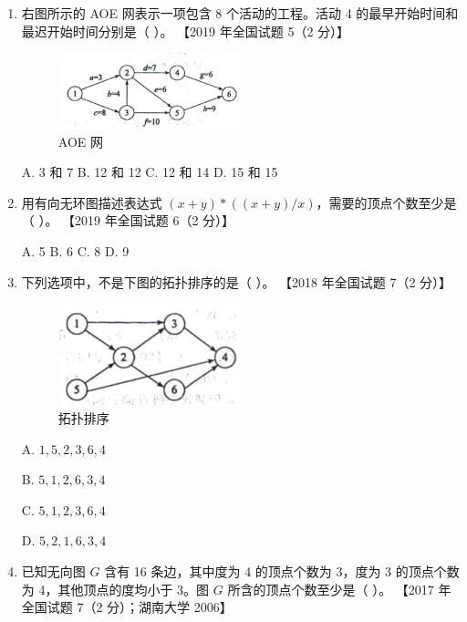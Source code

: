\documentclass[lang=cn,newtx,10pt,scheme=chinese]{elegantbook}
\begin{document}
\begin{enumerate}
    \item 右图所示的 AOE 网表示一项包含 8 个活动的工程。活动 4 的最早开始时间和最迟开始时间分别是（ ）。  
    【2019 年全国试题 5（2 分）】  
    \begin{figure}[h!]
            \centering
            \includegraphics[width=0.5\textwidth]{./figure/exercisePicPDF/chapter7/7-1.pdf}
            \caption{AOE 网}
    \end{figure}

    A. 3 和 7 \quad B. 12 和 12 \quad C. 12 和 14 \quad D. 15 和 15  

    \item 用有向无环图描述表达式 $(x + y) \ast ((x + y) / x)$，需要的顶点个数至少是（ ）。  
    【2019 年全国试题 6（2 分）】  

    A. 5 \quad B. 6  C. 8 \quad D. 9    

    \item 下列选项中，不是下图的拓扑排序的是（ ）。  
    【2018 年全国试题 7（2 分）】  

    \begin{figure}[h!]
            \centering
            \includegraphics[width=0.5\textwidth]{./figure/exercisePicPDF/chapter7/7-3.pdf}
            \caption{拓扑排序}
    \end{figure}

    A. $1, 5, 2, 3, 6, 4$  

    B. $5, 1, 2, 6, 3, 4$  

    C. $5, 1, 2, 3, 6, 4$  

    D. $5, 2, 1, 6, 3, 4$  

    \item 已知无向图 $G$ 含有 16 条边，其中度为 4 的顶点个数为 3，度为 3 的顶点个数为 4，其他顶点的度均小于 3。图 $G$ 所含的顶点个数至少是（ ）。  
    【2017 年全国试题 7（2 分）；湖南大学 2006】 


\end{enumerate}
\end{document}
